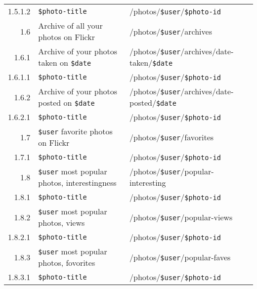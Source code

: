 \documentclass[11pt,a4paper]{article}
\newcommand{\var}[1]{\texttt{\${#1}}}
\begin{document}
\begin{center}
\begin{small}
\begin{longtable}{rp{5cm}l}
            1.5.1.2 &
            \var{photo-title} &
            /photos/\var{user}/\var{photo-id} \\

        1.6 &
        Archive of all your photos on Flickr &
        /photos/\var{user}/archives \\

          1.6.1 &
          Archive of your photos taken on \var{date} &
          /photos/\var{user}/archives/date-taken/\var{date} \\

            1.6.1.1 &
            \var{photo-title} &
            /photos/\var{user}/\var{photo-id} \\

          1.6.2 &
          Archive of your photos posted on \var{date} &
          /photos/\var{user}/archives/date-posted/\var{date} \\

            1.6.2.1 &
            \var{photo-title} &
            /photos/\var{user}/\var{photo-id} \\

        1.7 &
        \var{user} favorite photos on Flickr &
        /photos/\var{user}/favorites \\

          1.7.1 &
          \var{photo-title} &
          /photos/\var{user}/\var{photo-id} \\

        1.8 &
        \var{user} most popular photos, interestingness &
        /photos/\var{user}/popular-interesting \\

          1.8.1 &
          \var{photo-title} &
          /photos/\var{user}/\var{photo-id} \\

          1.8.2 &
          \var{user} most popular photos, views &
          /photos/\var{user}/popular-views \\

            1.8.2.1 &
            \var{photo-title} &
            /photos/\var{user}/\var{photo-id} \\

          1.8.3 &
          \var{user} most popular photos, fovorites &
          /photos/\var{user}/popular-faves \\

            1.8.3.1 &
            \var{photo-title} &
            /photos/\var{user}/\var{photo-id} \\


\end{longtable}
\end{small}
\end{center}
\end{document}
